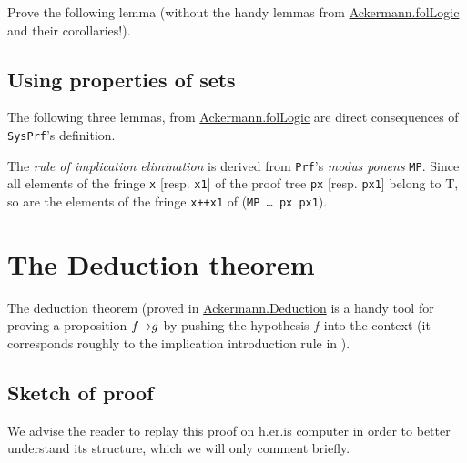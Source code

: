 

\begin{exercise}

Prove the following lemma (without the handy lemmas from
\href{../theories/html/hydras.Ackermann.folLogic.html}{Ackermann.folLogic} and their corollaries!).


\end{exercise}

\subsection{Using properties of sets}

The following three lemmas, from 
\href{../theories/html/hydras.Ackermann.folLogic.html}{Ackermann.folLogic} are direct consequences of \texttt{SysPrf}'s definition. 



The \emph{rule of implication elimination} is derived from \texttt{Prf}'s 
\emph{modus ponens} \texttt{MP}.  Since all elements of the fringe 
\texttt{x} [resp. \texttt{x1}] of the proof tree \texttt{px} [resp. \texttt{px1}] belong to T, so are the elements of the fringe \texttt{x++x1} of
(\texttt{MP \dots{}  px px1}).


\section{The Deduction theorem}

The deduction theorem (proved in \href{../theories/html/hydras.Ackermann.Deduction.html}{Ackermann.Deduction} is a handy 
tool for proving a proposition $f\mbox{$\rightarrow$} g$ by pushing 
the hypothesis $f$ into the context (it corresponds roughly to 
the implication introduction rule in \coq).



\subsection{Sketch of proof}

We advise the reader to replay this proof on h.er.is computer
 in order to better understand its structure, which we will only comment briefly.

